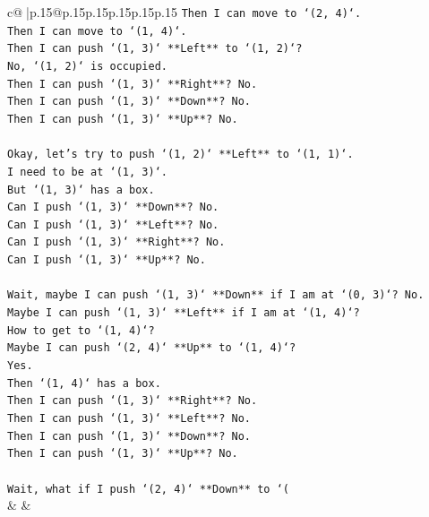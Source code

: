 \documentclass{article}
\begin{document}
{\begin{supertabular}{c@{$\;$}|p{.15\linewidth}@{}p{.15\linewidth}p{.15\linewidth}p{.15\linewidth}p{.15\linewidth}p{.15\linewidth}}
{{{\texttt{Then I can move to `(2, 4)`.} \\
\texttt{Then I can move to `(1, 4)`.} \\
\texttt{Then I can push `(1, 3)` **Left** to `(1, 2)`?} \\
\texttt{No, `(1, 2)` is occupied.} \\
\texttt{Then I can push `(1, 3)` **Right**? No.} \\
\texttt{Then I can push `(1, 3)` **Down**? No.} \\
\texttt{Then I can push `(1, 3)` **Up**? No.} \\
\\ 
\texttt{Okay, let's try to push `(1, 2)` **Left** to `(1, 1)`.} \\
\texttt{I need to be at `(1, 3)`.} \\
\texttt{But `(1, 3)` has a box.} \\
\texttt{Can I push `(1, 3)` **Down**? No.} \\
\texttt{Can I push `(1, 3)` **Left**? No.} \\
\texttt{Can I push `(1, 3)` **Right**? No.} \\
\texttt{Can I push `(1, 3)` **Up**? No.} \\
\\ 
\texttt{Wait, maybe I can push `(1, 3)` **Down** if I am at `(0, 3)`? No.} \\
\texttt{Maybe I can push `(1, 3)` **Left** if I am at `(1, 4)`?} \\
\texttt{How to get to `(1, 4)`?} \\
\texttt{Maybe I can push `(2, 4)` **Up** to `(1, 4)`?} \\
\texttt{Yes.} \\
\texttt{Then `(1, 4)` has a box.} \\
\texttt{Then I can push `(1, 3)` **Right**? No.} \\
\texttt{Then I can push `(1, 3)` **Left**? No.} \\
\texttt{Then I can push `(1, 3)` **Down**? No.} \\
\texttt{Then I can push `(1, 3)` **Up**? No.} \\
\\ 
\texttt{Wait, what if I push `(2, 4)` **Down** to `(} \\
            }
        }
    }
    & & \\ \\


\end{supertabular}}
\end{document}
